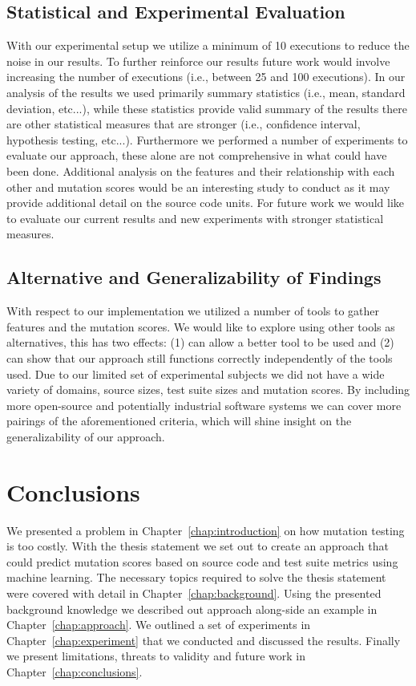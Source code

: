 \subsection{Statistical and Experimental Evaluation}
\label{subsec:conclusions_experimental_evaluation}
With our experimental setup we utilize a minimum of 10 executions to reduce the noise in our results. To further reinforce our results future work would involve increasing the number of executions (i.e., between 25 and 100 executions). In our analysis of the results we used primarily summary statistics (i.e., mean, standard deviation, etc...), while these statistics provide valid summary of the results there are other statistical measures that are stronger (i.e., confidence interval, hypothesis testing, etc...). Furthermore we performed a number of experiments to evaluate our approach, these alone are not comprehensive in what could have been done. Additional analysis on the features and their relationship with each other and mutation scores would be an interesting study to conduct as it may provide additional detail on the source code units. For future work we would like to evaluate our current results and new experiments with stronger statistical measures.


\subsection{Alternative and Generalizability of Findings}
\label{subsec:conclusions_generalizability_findings}
With respect to our implementation we utilized a number of tools to gather features and the mutation scores. We would like to explore using other tools as alternatives, this has two effects: (1) can allow a better tool to be used and (2) can show that our approach still functions correctly independently of the tools used. Due to our limited set of experimental subjects we did not have a wide variety of domains, source sizes, test suite sizes and mutation scores. By including more open-source and potentially industrial software systems we can cover more pairings of the aforementioned criteria, which will shine insight on the generalizability of our approach. 


\section{Conclusions}
\label{sec:conclusions_conclusions}
We presented a problem in Chapter~\ref{chap:introduction} on how mutation testing is too costly. With the thesis statement we set out to create an approach that could predict mutation scores based on source code and test suite metrics using machine learning. The necessary topics required to solve the thesis statement were covered with detail in Chapter~\ref{chap:background}. Using the presented background knowledge we described out approach along-side an example in Chapter~\ref{chap:approach}. We outlined a set of experiments in Chapter~\ref{chap:experiment} that we conducted and discussed the results. Finally we present limitations, threats to validity and future work in Chapter~\ref{chap:conclusions}.

